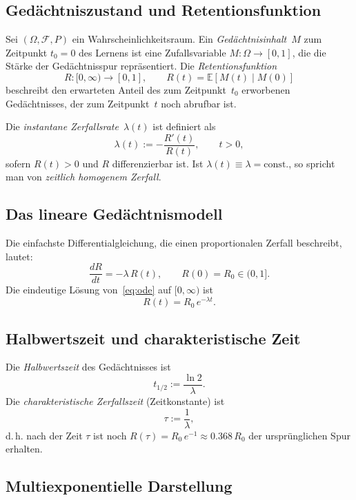 ﻿\documentclass[12pt,a4paper,twoside]{article}
\theoremstyle{theormstyle}
\theoremstyle{proofstyle}
\begin{document}
	\subsection{Gedächtniszustand und Retentionsfunktion}
	
		Sei $(\Omega, \mathcal{F}, P)$ ein Wahrscheinlichkeitsraum.
		Ein \emph{Gedächtnisinhalt}~$M$ zum Zeitpunkt $t_0 = 0$ des Lernens ist
		eine Zufallsvariable $M : \Omega \to [0,1]$, die die Stärke der
		Gedächtnisspur repräsentiert.
		Die \emph{Retentionsfunktion}
		\[
		R : [0,\infty) \to [0,1], \qquad R(t) = \mathbb{E}[M(t) \mid M(0)]
		\]
		beschreibt den erwarteten Anteil des zum Zeitpunkt~$t_0$ erworbenen
		Gedächtnisses, der zum Zeitpunkt~$t$ noch abrufbar ist.
	
		Die \emph{instantane Zerfallsrate}~$\lambda(t)$ ist definiert als
		\[
		\lambda(t) := -\frac{R'(t)}{R(t)}, \qquad t > 0,
		\]
		sofern $R(t) > 0$ und $R$ differenzierbar ist.
		Ist $\lambda(t) \equiv \lambda = \mathrm{const.}$, so spricht man von
		\emph{zeitlich homogenem Zerfall}.
	
	\subsection{Das lineare Gedächtnismodell}
	
	Die einfachste Differentialgleichung, die einen proportionalen Zerfall
	beschreibt, lautet:
	\begin{equation}
		\frac{dR}{dt} = -\lambda\,R(t), \qquad R(0) = R_0 \in (0,1].
		\label{eq:ode}
	\end{equation}
	Die eindeutige Lösung von~\eqref{eq:ode} auf $[0,\infty)$ ist
	\begin{equation}
		\boxed{R(t) = R_0\,e^{-\lambda t}.}
		\label{eq:loesung}
	\end{equation}
	
	\subsection{Halbwertszeit und charakteristische Zeit}
	
		Die \emph{Halbwertszeit} des Gedächtnisses ist
		\[
		t_{1/2} := \frac{\ln 2}{\lambda}.
		\]
		Die \emph{charakteristische Zerfallszeit} (Zeitkonstante) ist
		\[
		\tau := \frac{1}{\lambda},
		\]
		d.\,h. nach der Zeit $\tau$ ist noch $R(\tau) = R_0\,e^{-1} \approx 0.368\,R_0$
		der ursprünglichen Spur erhalten.
	
	\subsection{Multiexponentielle Darstellung}
	
\end{document}
